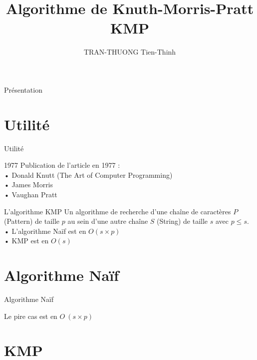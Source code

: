 \documentclass[12pt]{beamer}
\author{TRAN-THUONG Tien-Thinh}
\title{Algorithme de Knuth-Morris-Pratt KMP}
\begin{document}
\begin{frame}
\titlepage
\end{frame}

\begin{frame}{Présentation}
\tableofcontents
\end{frame}

\section{Utilité}
\begin{frame}{Utilité}
\begin{block}{1977}
Publication de l'article en 1977 : \\
• Donald Knutt (The Art of Computer Programming) \\
• James Morris \\
• Vaughan Pratt \\
\end{block}
\begin{block}{L'algorithme KMP}
Un algorithme de recherche d'une chaîne de caractères $P$ (Pattern) de taille $p$ au sein d'une autre chaîne $S$ (String) de taille $s$ avec $p \leq s$. \\
• L'algorithme Naïf est en $O(s \times p) $ \\
• KMP est en $O(s) $
\end{block}
\end{frame}

\section{Algorithme Naïf}
\begin{frame}{Algorithme Naïf}

Le pire cas est en $O\ (s \times p)$
\end{frame}

\section{KMP}
\end{document}
